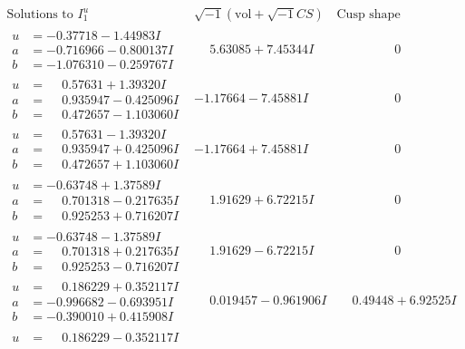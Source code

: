 \documentclass[1p]{elsarticle_modified}
\theoremstyle{definition}
\newcommand{\I}{\sqrt{-1}}
\begin{document}
$$\begin{array}{c|c|c}
\text{Solutions to }I^u_{1}& \I (\text{vol} + \sqrt{-1}CS) & \text{Cusp shape}\\
 \hline 
\begin{aligned}
u &= -0.37718 - 1.44983 I \\
a &= -0.716966 - 0.800137 I \\
b &= -1.076310 - 0.259767 I\end{aligned}
 & \phantom{-}5.63085 + 7.45344 I & \phantom{-0.000000 } 0 \\ \hline\begin{aligned}
u &= \phantom{-}0.57631 + 1.39320 I \\
a &= \phantom{-}0.935947 - 0.425096 I \\
b &= \phantom{-}0.472657 - 1.103060 I\end{aligned}
 & -1.17664 - 7.45881 I & \phantom{-0.000000 } 0 \\ \hline\begin{aligned}
u &= \phantom{-}0.57631 - 1.39320 I \\
a &= \phantom{-}0.935947 + 0.425096 I \\
b &= \phantom{-}0.472657 + 1.103060 I\end{aligned}
 & -1.17664 + 7.45881 I & \phantom{-0.000000 } 0 \\ \hline\begin{aligned}
u &= -0.63748 + 1.37589 I \\
a &= \phantom{-}0.701318 - 0.217635 I \\
b &= \phantom{-}0.925253 + 0.716207 I\end{aligned}
 & \phantom{-}1.91629 + 6.72215 I & \phantom{-0.000000 } 0 \\ \hline\begin{aligned}
u &= -0.63748 - 1.37589 I \\
a &= \phantom{-}0.701318 + 0.217635 I \\
b &= \phantom{-}0.925253 - 0.716207 I\end{aligned}
 & \phantom{-}1.91629 - 6.72215 I & \phantom{-0.000000 } 0 \\ \hline\begin{aligned}
u &= \phantom{-}0.186229 + 0.352117 I \\
a &= -0.996682 - 0.693951 I \\
b &= -0.390010 + 0.415908 I\end{aligned}
 & \phantom{-}0.019457 - 0.961906 I & \phantom{-}0.49448 + 6.92525 I \\ \hline\begin{aligned}
u &= \phantom{-}0.186229 - 0.352117 I \\

\end{aligned}
\end{array}$$
\end{document}

